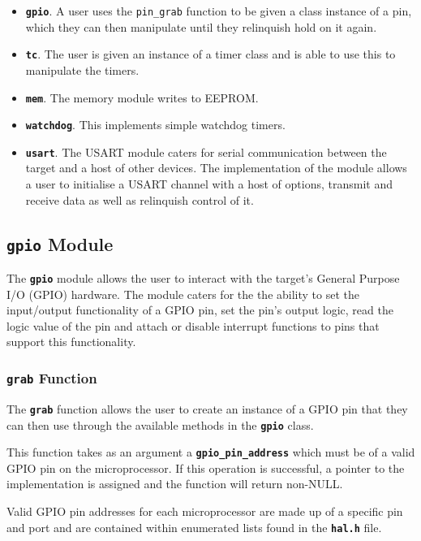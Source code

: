 \documentclass[a4paper, oneside, 11pt, titlepage, onecolumn, openright]{article}
\begin{document}
\begin{itemize}
\item \textbf{\texttt{gpio}}. A user uses the \texttt{pin\_grab} function to be given a class instance of a pin, which they can then manipulate until they relinquish hold on it again. 
\item \textbf{\texttt{tc}}. The user is given an instance of a timer class and is able to use this to manipulate the timers. 
\item \textbf{\texttt{mem}}. The memory module writes to EEPROM. 
\item \textbf{\texttt{watchdog}}. This implements simple watchdog timers.
\item \textbf{\texttt{usart}}. The USART module caters for serial communication between the target and a host of other devices. The implementation of the module allows a user to initialise a USART channel with a host of options, transmit and receive data as well as relinquish control of it.
\end{itemize}

\subsection{\textbf{\texttt{gpio}} Module}
			\label{ss:HALgpioModule}
			The \textbf{\texttt{gpio}} module allows the user to interact with the target's General Purpose I/O (GPIO) hardware. The module caters for the the ability to set the input/output functionality of a GPIO pin, set the pin's output logic, read the logic value of the pin and attach or disable interrupt functions to pins that support this functionality.

\subsubsection{\textbf{\texttt{grab}} Function}
			\label{sss:HALgrabFunction}
			The \textbf{\texttt{grab}} function allows the user to create an instance of a GPIO pin that they can then use through the available methods in the \textbf{\texttt{gpio}} class. 
			
			This function takes as an argument a \textbf{\texttt{gpio\_pin\_address}} which must be of a valid GPIO pin on the microprocessor. If this operation is successful, a pointer to the implementation is assigned and the function will return non-NULL.
			
			Valid GPIO pin addresses for each microprocessor are made up of a specific pin and port and are contained within enumerated lists found in the \textbf{\texttt{hal.h}} file. 			
\end{document}
